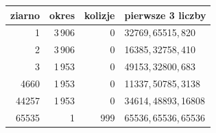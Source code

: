 \begin{tabular}{rrrl}\toprule
ziarno & okres & kolizje & pierwsze 3 liczby \\ \midrule
1 & 3\,906 & 0 & 32769,\,65515,\,820 \\
2 & 3\,906 & 0 & 16385,\,32758,\,410 \\
3 & 1\,953 & 0 & 49153,\,32800,\,683 \\
4660 & 1\,953 & 0 & 11337,\,50785,\,3138 \\
44257 & 1\,953 & 0 & 34614,\,48893,\,16808 \\
65535 & 1 & 999 & 65536,\,65536,\,65536 \\
\bottomrule\end{tabular}
